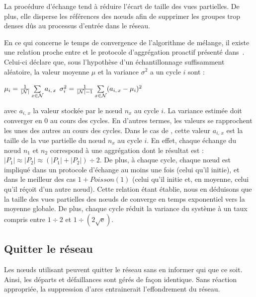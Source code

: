 La procédure d'échange tend à réduire l'écart de taille des vues partielles. De
plus, elle disperse les références des nœuds afin de supprimer les groupes trop
denses dûs au processus d'entrée dans le réseau.

En ce qui concerne le temps de convergence de l'algorithme de mélange, il existe
une relation proche entre \SPRAY et le protocole d'aggrégation proactif
présenté dans~\cite{jelasity2004epidemic, montresor2004robust}. Celui-ci déclare
que, sous l'hypothèse d'un échantillonnage suffisamment aléatoire, la valeur
moyenne $\mu$ et la variance $\sigma^2$ a un cycle $i$ sont :
\begin{center}
  $\mu_i = {1\over{|\mathcal{N}|}} \sum\limits_{x \in \mathcal{N}} a_{i,\,x}$
  \hfill
  $\sigma^2_i = {1\over{|\mathcal{N}|-1}}\sum\limits_{x \in \mathcal{N}}
  (a_{i,\,x} - \mu_i)^2$
\end{center}
avec $a_{i,\,x}$ la valeur stockée par le nœud $n_x$ au cycle $i$. La variance
estimée doit converger en 0 au cours des cycles. En d'autres termes, les valeurs
se rapprochent les unes des autres au cours des cycles. Dans le cas de \SPRAY,
cette valeur $a_{i,\,x}$ est la taille de la vue partielle du nœud $n_x$ au
cycle $i$. En effet, chaque échange du nœud $n_1$ et $n_2$ correspond à une
aggrégation dont le résultat est :
$|P_1|\approx|P_2|\approx{(|P_1| + |P_2|) \div 2}$.  De plus, à chaque cycle,
chaque nœud est impliqué dans un protocole d'échange au moins une fois (celui
qu'il initie), et dans le meilleur des cas $1+Poisson(1)$ (celui qu'il initie
et, en moyenne, celui qu'il réçoit d'un autre nœud). Cette relation étant
établie, nous en déduisons que la taille des vues partielles des nœuds de \SPRAY
converge en temps exponentiel vers la moyenne globale. De plus, chaque cycle
réduit la variance du système à un taux compris entre ${1\div 2}$ et
$1\div ({2\sqrt{\text{e}}})$.

\subsection{Quitter le réseau}
\label{net:subsec:leaving}

Les nœuds utilisant \SPRAY peuvent quitter le réseau sans en informer qui que ce
soit. Ainsi, les départs et défaillances sont gérés de façon identique. Sans
réaction appropriée, la suppression d'arcs entrainerait l'effondrement du
réseau.

